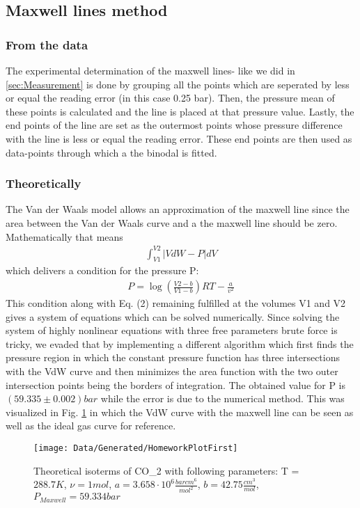 \documentclass[a4paper,10pt,twocolumn]{article}
\begin{document}
    \subsection{Maxwell lines method}\label{subsec:maxwellMethod}
    \subsubsection{From the data}\label{subsubsec:maxwellFormData}
    The experimental determination of the maxwell lines- like we did in \ref{sec:Measurement} is done by  grouping all the points which are seperated by less or equal the reading error (in this case 0.25 bar).
    Then, the pressure mean of these points is calculated and the line is placed at that pressure value. 
    Lastly, the end points of the line are set as the outermost points whose pressure difference with the line is less or equal the reading error.
    These end points are then used as data-points through which a the binodal is fitted.
    \subsubsection{Theoretically}\label{subsubsec:maxwellFromTheory}
    The Van der Waals model allows an approximation of the maxwell line since the area between the Van der Waals curve and a the maxwell line should be zero.
    Mathematically that means
    \begin{align}
        \int_{V1}^{V2} |VdW - P| dV
        \end{align}
    which delivers a condition for the pressure P:
    \begin{align}
        P=\log(\frac{V2-b}{V1-b}) RT - \frac{a}{v^2}
    \end{align}
    This condition along with Eq. (2) remaining fulfilled at the volumes V1 and V2 gives a system of equations which can be solved numerically.
    Since solving the system of highly nonlinear equations with three free parameters brute force is tricky, we evaded that by implementing a different algorithm
    which first finds the pressure region in which the constant pressure function has three intersections with the VdW curve and then minimizes the area function
    with the two outer intersection points being the borders of integration.
    The obtained value for P is $(59.335\pm 0.002) bar$ while the error is due to the numerical method.
    This was visualized in Fig. \ref{fig:homeworkPlotOne} in which the VdW curve with the maxwell line can be seen as well as the ideal gas curve for reference.
    \begin{figure}
        \begin{center}
            \texttt{[image: Data/Generated/HomeworkPlotFirst]}
            \caption[]{Theoretical isoterms of CO_2\) with following parameters:
            T = $288.7K$, $\nu=1 mol$, $a=3.658\cdot 10^6 \frac{bar cm^6}{mol^2}$, $b=42.75 \frac{cm^3}{mol}$, $P_{Maxwell}=59.334 bar$}
            \label{fig:homeworkPlotOne}
        \end{center}
    \end{figure}
    
\end{document}

